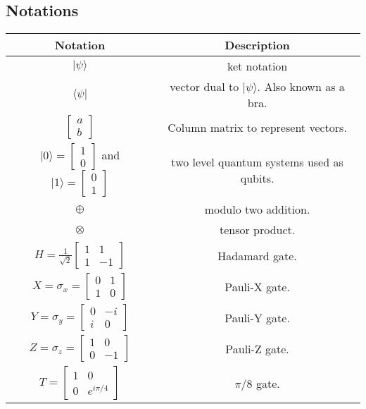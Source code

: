 \documentclass[12pt]{report}
\begin{document}
\subsection{Notations}
\begin{table}[h!]
\centering
\begin{tabular}{|c|c|}
\hline
\textbf{Notation} & \textbf{Description}\\
\hline
$|\psi\rangle$ & ket notation \\
\hline
$\langle\psi|$ & vector dual to $|\psi\rangle$. Also known as a bra.\\
\hline
$\begin{bmatrix} a\\  b \end{bmatrix}$ & Column matrix to represent vectors.\\
\hline
$|0\rangle = \begin{bmatrix} 1\\ 0 \end{bmatrix} $ and $|1\rangle = \begin{bmatrix} 0\\1 \end{bmatrix}$ & two level quantum systems used as qubits. \\ 
\hline
$\oplus$ & modulo two addition.\\
\hline
$\otimes$ & tensor product.\\
\hline
$H = \frac{1}{\sqrt{2}} \begin{bmatrix} 1 & 1\\1&-1\end{bmatrix} $ & Hadamard gate.\\
\hline
$X = \sigma_x = \begin{bmatrix} 0 & 1\\1&0\end{bmatrix}$ & Pauli-X gate.\\
\hline
$Y = \sigma_y = \begin{bmatrix} 0 & -i\\i&0\end{bmatrix}$ & Pauli-Y gate.\\
\hline
$Z = \sigma_z = \begin{bmatrix} 1 & 0\\0&-1\end{bmatrix}$ & Pauli-Z gate.\\
\hline
$T = \begin{bmatrix} 1 & 0\\0& e^{i\pi / 4}\end{bmatrix}$ &  $\pi /8$ gate.\\

\end{tabular}
\end{table}
\end{document}

